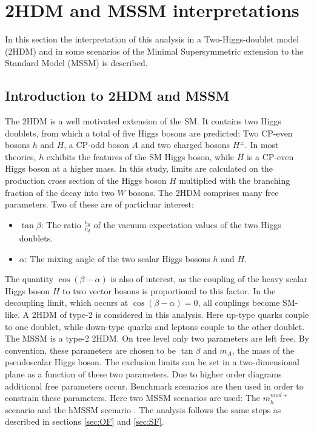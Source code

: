 \newpage
\section{2HDM and MSSM interpretations}\label{sec:2HDM}
In this section the interpretation of this analysis in a Two-Higgs-doublet model (2HDM) and in some scenarios of the Minimal Supersymmetric extension to the Standard Model (MSSM) is described. \\


\subsection*{Introduction to 2HDM and MSSM}

The 2HDM is a well motivated extension of the SM. It contains two Higgs doublets, from which a total of five Higgs bosons are predicted: Two CP-even bosons $h$ and $H$, a CP-odd boson $A$ and two charged bosons $H^\pm$. In most theories, $h$ exhibits the features of the SM Higgs boson, while $H$ is a CP-even Higgs boson at a higher mass. In this study, limits are calculated on the production cross section of the Higgs boson $H$ multiplied with the branching fraction of the decay into two $W$ bosons.\newline
The 2HDM comprises many free parameters. Two of these are of particluar interest:
\begin{itemize}
\item $\tan\beta$: The ratio $\frac{v_u}{v_d}$ of the vacuum expectation values of the two Higgs doublets.
\item $\alpha$: The mixing angle of the two scalar Higgs bosons $h$ and $H$.
\end{itemize}
The quantity $\cos(\beta-\alpha)$ is also of interest, as the coupling of the heavy scalar Higgs boson $H$ to two vector bosons is proportional to this factor. In the decoupling limit, which occurs at $\cos(\beta-\alpha)=0$, all couplings become SM-like.\newline
A 2HDM of type-2 is considered in this analysis. Here up-type quarks couple to one doublet, while down-type quarks and leptons couple to the other doublet. The MSSM is a type-2 2HDM. On tree level only two parameters are left free. By convention, these parameters are chosen to be $\tan\beta$ and $m_{A}$, the mass of the pseudoscalar Higgs boson. The exclusion limits can be set in a two-dimensional plane as a function of these two parameters. Due to higher order diagrams additional free parameters occur. Benchmark scenarios are then used in order to constrain these parameters. Here two MSSM scenarios are used: The $m_{h}^{mod+}$ scenario and the hMSSM scenario \cite{Carena:2013ytb}.\newline
The analysis follows the same steps as described in sections \ref{sec:OF} and \ref{sec:SF}.

